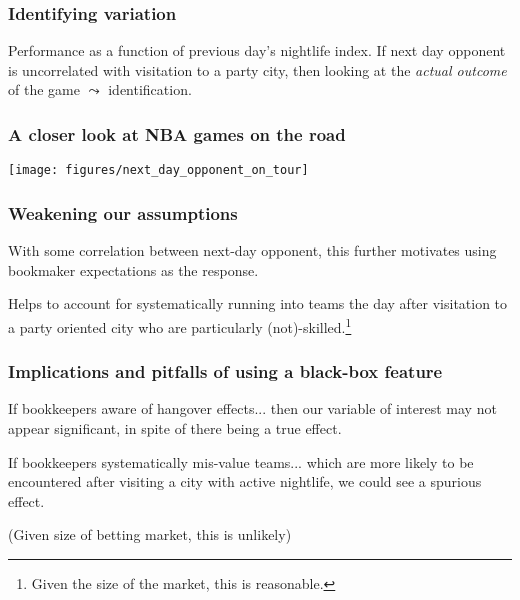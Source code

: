 \documentclass{beamer}
\begin{document}
\begin{frame}   \frametitle{Identifying variation}
  \begin{block}{Performance as a function of previous day's nightlife index.}     If next day opponent is uncorrelated with visitation to a party city,
    then looking at the \emph{actual outcome} of the game $\leadsto$ identification.
  \end{block}
\end{frame}


\begin{frame}   \frametitle{A closer look at NBA games on the road}
  \centering \texttt{[image: figures/next\_day\_opponent\_on\_tour]} 
\end{frame}

\begin{frame}
  \frametitle{Weakening our assumptions}
  \begin{block}{With some correlation between next-day opponent, this further motivates using bookmaker expectations as the response.}
    
    Helps to account for systematically running into teams the day after visitation to 
    a party oriented city who are particularly (not)-skilled.\footnote{Given the size of the market, this is reasonable.}
  \end{block}
\end{frame}

\begin{frame}
  \frametitle{Implications and pitfalls of using a black-box feature}
  \begin{block}{If bookkeepers aware of hangover effects...}     then our variable of interest may not appear significant, in spite of there being a true effect.   \end{block}
  \vspace{12pt}
  \begin{block}{If bookkeepers systematically mis-value teams...}
     which are more likely to be encountered after visiting a city with active nightlife, we could see a spurious effect.

      (Given size of betting market, this is unlikely)
    \end{block}   
\end{frame}
\end{document}
